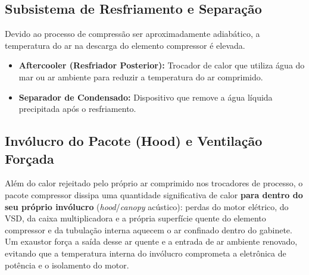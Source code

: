 \documentclass[12pt,a4paper]{article}
\numberwithin{equation}{section}
\numberwithin{table}{section}
\numberwithin{figure}{section}
\begin{document}
	\subsection{\textbf{Subsistema de Resfriamento e Separação}}
	Devido ao processo de compressão ser aproximadamente adiabático, a temperatura do ar na descarga do elemento compressor é elevada.
	\begin{itemize}
		\item \textbf{Aftercooler (Resfriador Posterior):} Trocador de calor que utiliza água do mar ou ar ambiente para reduzir a temperatura do ar comprimido.
		\item \textbf{Separador de Condensado:} Dispositivo que remove a água líquida precipitada após o resfriamento.
	\end{itemize}

	\subsection{\textbf{Invólucro do Pacote (Hood) e Ventilação Forçada}}
	Além do calor rejeitado pelo próprio ar comprimido nos trocadores de processo, o pacote compressor dissipa uma quantidade significativa de calor \textbf{para dentro do seu próprio invólucro} (\textit{hood}/\textit{canopy} acústico): perdas do motor elétrico, do VSD, da caixa multiplicadora e a própria superfície quente do elemento compressor e da tubulação interna aquecem o ar confinado dentro do gabinete. Um exaustor força a saída desse ar quente e a entrada de ar ambiente renovado, evitando que a temperatura interna do invólucro comprometa a eletrônica de potência e o isolamento do motor.
\end{document}
